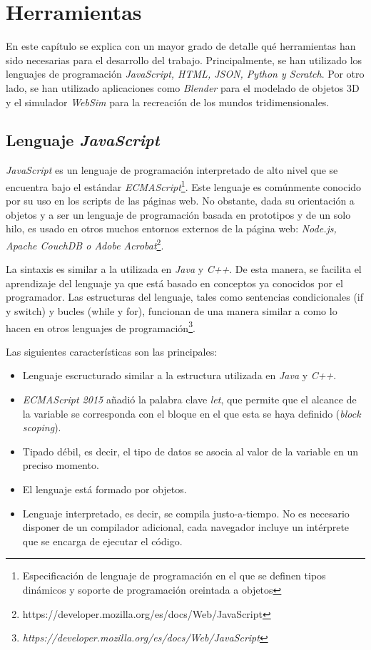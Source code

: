 \chapter{Herramientas}
\label{chap:herramientas} 
En este capítulo se explica con un mayor grado de detalle qué herramientas han sido necesarias para el desarrollo del trabajo. Principalmente, se han utilizado los lenguajes de programación \textit{JavaScript, HTML, JSON, Python y Scratch}. Por otro lado, se han utilizado aplicaciones como \textit{Blender} para el modelado de objetos 3D y el simulador \textit{WebSim} para la recreación de los mundos tridimensionales.
   
\section{Lenguaje \textit{JavaScript}}
\textit{JavaScript} es un lenguaje de programación interpretado de alto nivel que se encuentra bajo el estándar \textit{ECMAScript}\footnote{Especificación de lenguaje de programación en el que se definen tipos dinámicos y soporte de programación oreintada a objetos}. Este lenguaje es comúnmente conocido por su uso en los scripts de las páginas web. No obstante, dada su orientación a objetos y a ser un lenguaje de programación basada en prototipos y de un solo hilo, es usado en otros muchos entornos externos de la página web: \textit{Node.js, Apache CouchDB o Adobe Acrobat}\footnote{https://developer.mozilla.org/es/docs/Web/JavaScript}. \newline

La sintaxis es similar a la utilizada en \textit{Java} y \textit{C++}. De esta manera, se facilita el aprendizaje del lenguaje ya que está basado en conceptos ya conocidos por el programador. Las estructuras del lenguaje, tales como sentencias condicionales (if y switch) y bucles (while y for), funcionan de una manera similar a como lo hacen en otros lenguajes de programación\footnote{\textit{https://developer.mozilla.org/es/docs/Web/JavaScript}}. \newline

Las siguientes características son las principales:
\begin{itemize}
    \item Lenguaje escructurado similar a la estructura utilizada en \textit{Java} y \textit{C++}.
    \item \textit{ECMAScript 2015} añadió la palabra clave \textit{let}, que permite que el alcance de la variable se corresponda con el bloque en el que esta se haya definido (\textit{block scoping}).
    \item Tipado débil, es decir, el tipo de datos se asocia al valor de la variable en un preciso momento.
    \item El lenguaje está formado por objetos.
    \item Lenguaje interpretado, es decir, se compila justo-a-tiempo. No es necesario disponer de un compilador adicional, cada navegador incluye un intérprete que se encarga de ejecutar el código.
\end{itemize}

